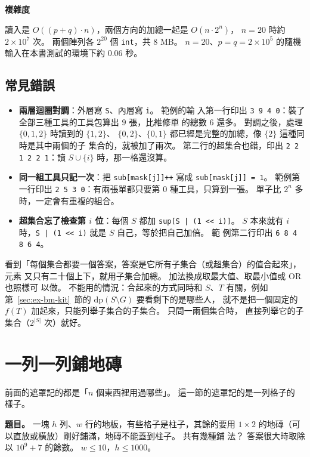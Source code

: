 \textbf{複雜度}

讀入是 $O((p + q) \cdot n)$，兩個方向的加總一起是 $O(n \cdot 2^n)$，
$n = 20$ 時約 $2 \times 10^7$ 次。 兩個陣列各 $2^{20}$ 個 \texttt{int}，共
$8$ MB。 $n = 20$、$p = q = 2 \times 10^5$ 的隨機輸入在本書測試的環境下約
$0.06$ 秒。

\subsection{常見錯誤}

\begin{itemize}
\item \textbf{兩層迴圈對調}：外層寫 \texttt{S}、內層寫 \texttt{i}。 範例的輸
入第一行印出 \texttt{3 9 4 0}：裝了全部三種工具的工具包算出 $9$ 張，比維修單
的總數 $6$ 還多。 對調之後，處理 $\{0, 1, 2\}$ 時讀到的 $\{1, 2\}$、
$\{0, 2\}$、$\{0, 1\}$ 都已經是完整的加總，像 $\{2\}$ 這種同時是其中兩個的子
集合的，就被加了兩次。 第二行的超集合也錯，印出 \texttt{2 2 1 2 2 1}：讀
$S \cup \{i\}$ 時，那一格還沒算。
\item \textbf{同一組工具只記一次}：把 \texttt{sub[mask[j]]++} 寫成
\texttt{sub[mask[j]] = 1}。 範例第一行印出 \texttt{2 5 3 0}：有兩張單都只要第 $0$
種工具，只算到一張。 單子比 $2^n$ 多時，一定會有重複的組合。
\item \textbf{超集合忘了檢查第 $i$ 位}：每個 $S$ 都加 \texttt{sup[S | (1 << i)]}。
$S$ 本來就有 $i$ 時，\texttt{S | (1 << i)} 就是 $S$ 自己，等於把自己加倍。 範
例第二行印出 \texttt{6 8 4 8 6 4}。
\end{itemize}

看到「每個集合都要一個答案，答案是它所有子集合（或超集合）的值合起來」，元素
又只有二十個上下，就用子集合加總。 加法換成取最大值、取最小值或 OR 也照樣可
以做。 不能用的情況：合起來的方式同時和 $S$、$T$ 有關，例如
第~\ref{sec:ex-bm-kit}~節的 $\mathrm{dp}(S \setminus G)$ 要看剩下的是哪些人，
就不是把一個固定的 $f(T)$ 加起來，只能列舉子集合的子集合。 只問一兩個集合時，
直接列舉它的子集合（$2^{|S|}$ 次）就好。

\section{一列一列鋪地磚}
\label{sec:bm-tiling}

前面的遮罩記的都是「$n$ 個東西裡用過哪些」。 這一節的遮罩記的是一列格子的
樣子。

\textbf{題目。} 一塊 $h$ 列、$w$ 行的地板，有些格子是柱子，其餘的要用
$1 \times 2$ 的地磚（可以直放或橫放）剛好鋪滿，地磚不能蓋到柱子。 共有幾種鋪
法？ 答案很大時取除以 $10^9 + 7$ 的餘數。 $w \le 10$，$h \le 1000$。

